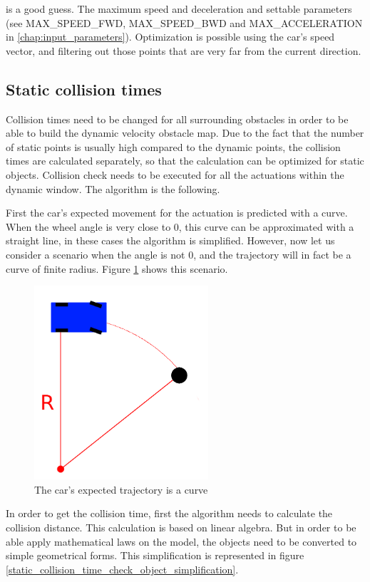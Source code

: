 is a good guess. The maximum speed and deceleration and settable parameters (see MAX\_SPEED\_FWD, MAX\_SPEED\_BWD and MAX\_ACCELERATION in \ref{chap:input_parameters}). Optimization is possible using the car's speed vector, and filtering out those points that are very far from the current direction.

\subsection{Static collision times}
Collision times need to be changed for all surrounding obstacles in order to be able to build the dynamic velocity obstacle map. Due to the fact that the number of static points is usually high compared to the dynamic points, the collision times are calculated separately, so that the calculation can be optimized for static objects. Collision check needs to be executed for all the actuations within the dynamic window. The algorithm is the following.

First the car's expected movement for the actuation is predicted with a curve. When the wheel angle is very close to 0, this curve can be approximated with a straight line, in these cases the algorithm is simplified. However, now let us consider a scenario when the angle is not 0, and the trajectory will in fact be a curve of finite radius. Figure \ref{static_collision_time_check_objects} shows this scenario.

\begin{figure}[!ht]
    \centering
    \includegraphics[height=72mm]{figures/raw/static_collision_time_check_objects.png}
    \caption{The car's expected trajectory is a curve}
    \label{static_collision_time_check_objects}
\end{figure}

In order to get the collision time, first the algorithm needs to calculate the collision distance. This calculation is based on linear algebra. But in order to be able apply mathematical laws on the model, the objects need to be converted to simple geometrical forms. This simplification is represented in figure \ref{static_collision_time_check_object_simplification}.

